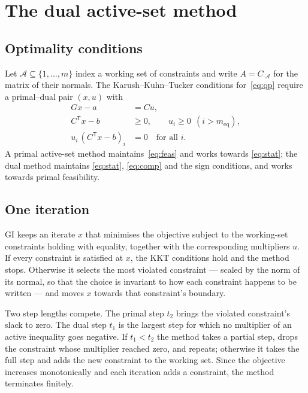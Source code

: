 \documentclass[11pt,a4paper]{article}
\theoremstyle{plain}
\theoremstyle{remark}
\newcommand{\T}{^{\mathsf{T}}}
\begin{document}
\section{The dual active-set method}
\label{sec:method}

\subsection{Optimality conditions}

Let $\mathcal{A} \subseteq \{1,\dots,m\}$ index a working set of constraints and
write $A = C_{\cdot\mathcal{A}}$ for the matrix of their normals. The
Karush--Kuhn--Tucker conditions for~\eqref{eq:qp} require a primal--dual pair
$(x, u)$ with
\begin{align}
  G x - a &= C u, \label{eq:stat}\\
  C\T x - b &\ge 0, \qquad u_i \ge 0 \ \ (i > m_{\mathrm{eq}}), \label{eq:feas}\\
  u_i \, (C\T x - b)_i &= 0 \quad \text{for all } i. \label{eq:comp}
\end{align}
A primal active-set method maintains~\eqref{eq:feas} and works towards
\eqref{eq:stat}; the dual method maintains \eqref{eq:stat},
\eqref{eq:comp} and the sign conditions, and works towards primal feasibility.

\subsection{One iteration}

GI keeps an iterate $x$ that minimises the objective subject to the working-set
constraints holding with equality, together with the corresponding multipliers
$u$. If every constraint is satisfied at $x$, the KKT conditions hold and the
method stops. Otherwise it selects the most violated constraint --- scaled by the
norm of its normal, so that the choice is invariant to how each constraint
happens to be written --- and moves $x$ towards that constraint's boundary.

Two step lengths compete. The primal step $t_2$ brings the violated constraint's
slack to zero. The dual step $t_1$ is the largest step for which no multiplier of
an active inequality goes negative. If $t_1 < t_2$ the method takes a partial
step, drops the constraint whose multiplier reached zero, and repeats; otherwise
it takes the full step and adds the new constraint to the working set. Since the
objective increases monotonically and each iteration adds a constraint, the
method terminates finitely.
\end{document}
